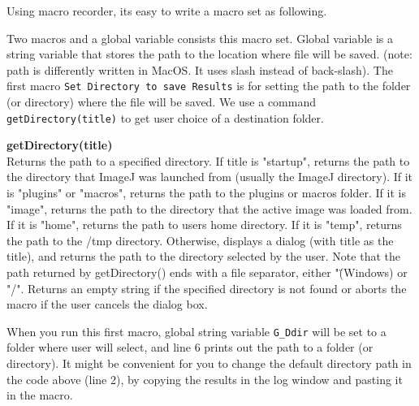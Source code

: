 \documentclass[11pt,a4paper,oneside]{report}
\newenvironment{indentCom}%
{\begin{list}{}%
         {\setlength{\leftmargin}{1em}}%
         \item[]%
}
{\end{list}}
\newcommand{\ilcom}[1]{\texttt{\small#1}}
\begin{document}
Using macro recorder, its easy to write a macro set as following. 



Two macros and a global variable consists this macro set. 
Global variable is a string variable that stores the path to the location where file will be saved. 
(note: path is differently written in MacOS. It uses slash instead of back-slash). 
The first macro \ilcom{Set Directory to save Results} is for setting the path to the folder 
(or directory) where the file will be saved. 
We use a command \ilcom{getDirectory(title)} to get user choice of a destination folder. 

\begin{indentCom}
\textbf{getDirectory(title)}\\
Returns the path to a specified directory. If title is "startup", returns the path to the directory 
that ImageJ was launched from (usually the ImageJ directory). If it is "plugins" or 
"macros", returns the path to the plugins or macros folder. If it is "image", 
returns the path to the directory that the active image was loaded from. 
If it is "home", returns the path to users home directory. 
If it is "temp", returns the path to the /tmp directory. 
Otherwise, displays a dialog (with title as the title), 
and returns the path to the directory selected by the user. 
Note that the path returned by getDirectory() ends with a file separator, 
either "\" (Windows) or "/". Returns an empty string if the specified directory is not found or 
aborts the macro if the user cancels the dialog box.
\end{indentCom}

When you run this first macro, global string variable \ilcom{G\_Ddir} 
will be set to a folder where user will select, and line 6 prints out the path to 
a folder (or directory). It might be convenient for you to change the default directory path 
in the code above (line 2), by copying the results in the log window and pasting it in the macro. 
\end{document}
